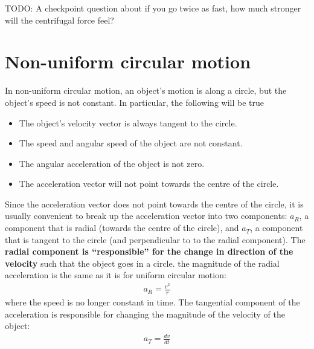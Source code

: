 TODO: A checkpoint question about if you go twice as fast, how much stronger will the centrifugal force feel?

\section{Non-uniform circular motion}
In non-uniform circular motion, an object's motion is along a circle, but the object's speed is not constant. In particular, the following will be true
\begin{itemize}
\item The object's velocity vector is always tangent to the circle.
\item The speed and angular speed of the object are not constant.
\item The angular acceleration of the object is not zero.
\item The acceleration vector will not point towards the centre of the circle. 
\end{itemize}
Since the acceleration vector does not point towards the centre of the circle, it is usually convenient to break up the acceleration vector into two components: $a_R$, a component that is radial (towards the centre of the circle), and $a_T$, a component that is tangent to the circle (and perpendicular to to the radial component). The \textbf{radial component is ``responsible'' for the change in direction of the velocity} such that the object goes in a circle. the magnitude of the radial acceleration is the same as it is for uniform circular motion:
\begin{align*}
a_R=\frac{v^2}{r}
\end{align*}
where the speed is no longer constant in time. The tangential component of the acceleration is responsible for changing the magnitude of the velocity of the object:
\begin{align*}
a_T = \frac{dv}{dt}
\end{align*}


